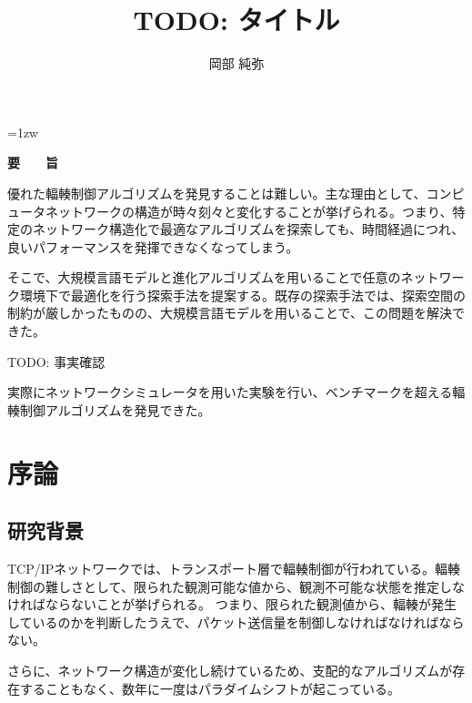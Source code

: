 \documentclass[a4paper,11pt]{jreport}
\title{TODO: タイトル}
\author{岡部 純弥}
\begin{document}
\maketitle
\thispagestyle{empty}
\newpage

\thispagestyle{empty}
\vspace*{20pt plus 1fil}
\parindent=1zw
\noindent
\begin{center}
{\Large \bf 要　　旨}
\vspace{2cm}
\end{center}

優れた輻輳制御アルゴリズムを発見することは難しい。主な理由として、コンピュータネットワークの構造が時々刻々と変化することが挙げられる。つまり、特定のネットワーク構造化で最適なアルゴリズムを探索しても、時間経過につれ、良いパフォーマンスを発揮できなくなってしまう。

そこで、大規模言語モデルと進化アルゴリズムを用いることで任意のネットワーク環境下で最適化を行う探索手法を提案する。既存の探索手法では、探索空間の制約が厳しかったものの、大規模言語モデルを用いることで、この問題を解決できた。

TODO: 事実確認

実際にネットワークシミュレータを用いた実験を行い、ベンチマークを超える輻輳制御アルゴリズムを発見できた。

\par
\vspace{0pt plus 1fil}
\newpage

\tableofcontents
\listoffigures

\pagebreak \setcounter{page}{1}

\chapter{序論}

\section{研究背景}

TCP/IPネットワークでは、トランスポート層で輻輳制御が行われている。輻輳制御の難しさとして、限られた観測可能な値から、観測不可能な状態を推定しなければならないことが挙げられる。
つまり、限られた観測値から、輻輳が発生しているのかを判断したうえで、パケット送信量を制御しなければなければならない。

さらに、ネットワーク構造が変化し続けているため、支配的なアルゴリズムが存在することもなく、数年に一度はパラダイムシフトが起こっている。
\end{document}
